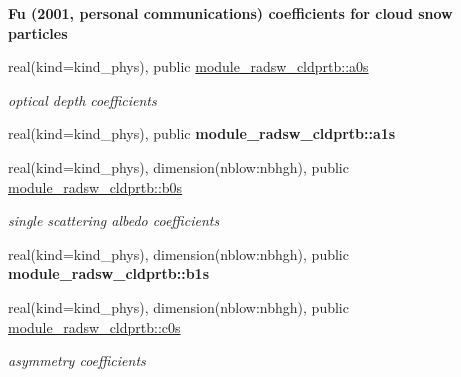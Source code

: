 \begin{Indent}\textbf{ Fu (2001, personal communications) coefficients for cloud snow particles}\par
\begin{DoxyCompactItemize}
\item 
\mbox{\label{namespacemodule__radsw__cldprtb_a81ba576e28e5844772d040ff7543faae}} 
real(kind=kind\+\_\+phys), public \hyperlink{namespacemodule__radsw__cldprtb_a81ba576e28e5844772d040ff7543faae}{module\+\_\+radsw\+\_\+cldprtb\+::a0s}
\begin{DoxyCompactList}\small\item\em optical depth coefficients \end{DoxyCompactList}\item 
\mbox{\label{namespacemodule__radsw__cldprtb_a9bf8de06b96c5014ca7f21fd39d84257}} 
real(kind=kind\+\_\+phys), public {\bfseries module\+\_\+radsw\+\_\+cldprtb\+::a1s}
\item 
\mbox{\label{namespacemodule__radsw__cldprtb_a391fbdda62f6fba95e105c2041e16880}} 
real(kind=kind\+\_\+phys), dimension(nblow\+:nbhgh), public \hyperlink{namespacemodule__radsw__cldprtb_a391fbdda62f6fba95e105c2041e16880}{module\+\_\+radsw\+\_\+cldprtb\+::b0s}
\begin{DoxyCompactList}\small\item\em single scattering albedo coefficients \end{DoxyCompactList}\item 
\mbox{\label{namespacemodule__radsw__cldprtb_a2d2296e76fb85b66bd4583bcb9fa271b}} 
real(kind=kind\+\_\+phys), dimension(nblow\+:nbhgh), public {\bfseries module\+\_\+radsw\+\_\+cldprtb\+::b1s}
\item 
\mbox{\label{namespacemodule__radsw__cldprtb_aab7693c5f31ce2182bca61aff77996bc}} 
real(kind=kind\+\_\+phys), dimension(nblow\+:nbhgh), public \hyperlink{namespacemodule__radsw__cldprtb_aab7693c5f31ce2182bca61aff77996bc}{module\+\_\+radsw\+\_\+cldprtb\+::c0s}
\begin{DoxyCompactList}\small\item\em asymmetry coefficients \end{DoxyCompactList}\end{DoxyCompactItemize}
\end{Indent}

